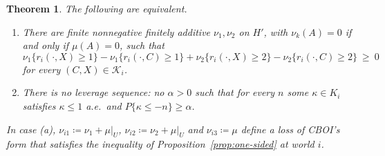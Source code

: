 \documentclass[11pt]{article}
\newtheorem{theorem}{Theorem}
\theoremstyle{remark}\newtheorem{remark}[theorem]{Remark}
\newcommand{\Kscr}{\mathcal K}
\begin{document}
\begin{theorem}\label{thm:leverage}
The following are equivalent.
\begin{enumerate}[label=(\alph*)]
\item There are finite nonnegative finitely additive $\nu_1,\nu_2$ on $H'$, with
$\nu_k(A)=0$ if and only if $\mu(A)=0$, such that
\[
 \nu_1\{r_i(\cdot,X)\ge1\}-\nu_1\{r_i(\cdot,C)\ge1\}
 +\nu_2\{r_i(\cdot,X)\ge2\}-\nu_2\{r_i(\cdot,C)\ge2\}\ \ge\ 0
\]
for every $(C,X)\in\Kscr_i$.
\item There is no \emph{leverage sequence}: no $\alpha>0$ such that for every
$n$ some $\kappa\in K_i$ satisfies $\kappa\le1$ a.e.\ and
$P\{\kappa\le-n\}\ge\alpha$.
\end{enumerate}
In case (a), $\nu_{i1}\coloneqq\nu_1+\mu|_U$, $\nu_{i2}\coloneqq\nu_2+\mu|_U$
and $\nu_{i3}\coloneqq\mu$ define a loss of CBOI's form that satisfies the
inequality of Proposition~\ref{prop:one-sided} at world $i$.
\end{theorem}
\end{document}
